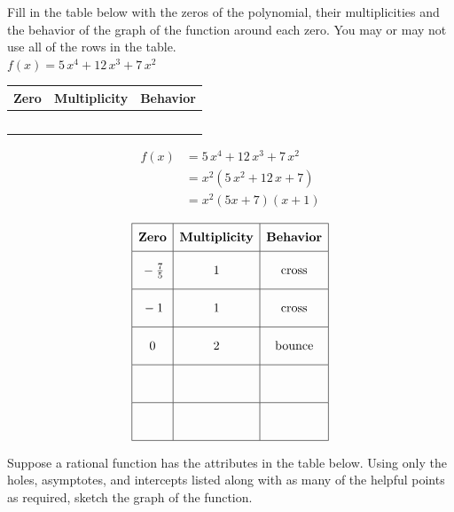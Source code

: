 \documentclass[addpoints]{exam}
\begin{document}
\begin{questions}
\question[10] Fill in the table below with the zeros of the polynomial, their multiplicities and the behavior of the graph of the function around each zero. You may or may not use all of the rows in the table.\\
    
    \(\displaystyle{ f(x) = 5 \, x^{4} + 12 \, x^{3} + 7 \, x^{2} }\)\
    
\renewcommand{\arraystretch}{3}
\begin{tabular}{|p{20mm}|p{25mm}|p{20mm}|}\hline
\textbf{Zero} & \textbf{Multiplicity} & \textbf{Behavior}\\ \hline
 & & \\ \hline
 & & \\ \hline
 & & \\ \hline
 & & \\ \hline
 & & \\ \hline
\end{tabular}
\begin{solution}
\[\begin{aligned} f(x) &= 5 \, x^{4} + 12 \, x^{3} + 7 \, x^{2} \\ &= x^2(5 \, x^{2} + 12 \, x + 7) \\ &= x^2(5x + 7)(x + 1) \end{aligned}\]

 \[\begin{array}{|c|c|c|} \hline \rule[-0.8em]{0pt}{2.2em} \textbf{Zero} & \textbf{Multiplicity} & \textbf{Behavior} \\ \hline \rule[-1.2em]{0pt}{3em} -\frac{7}{5} & 1 & \text{cross} \\ \hline \rule[-1.2em]{0pt}{3em} -1 & 1 & \text{cross} \\ \hline \rule[-1.2em]{0pt}{3em} 0 & 2 & \text{bounce} \\ \hline \rule[-1.2em]{0pt}{3em} & & \\ \hline \rule[-1.2em]{0pt}{3em} & & \\ \hline \end{array}\]
\end{solution}
\newpage

\question[5] Suppose a rational function has the attributes in the table below. Using only the holes, asymptotes, and intercepts listed along with as many of the helpful points as required, sketch the graph of the function.\\
\renewcommand{\arraystretch}{1.5}
    

\end{questions}
\end{document}
